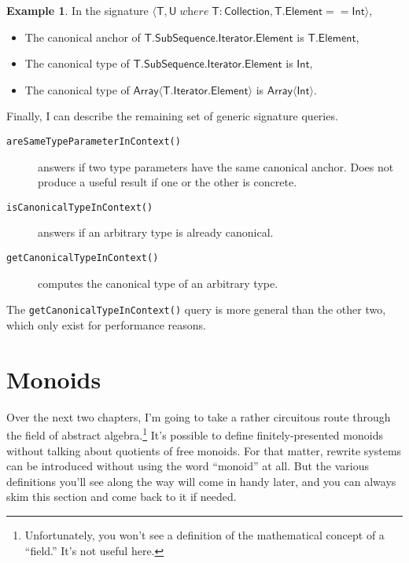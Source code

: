 \documentclass[headsepline,bibliography=totoc]{scrreport}
\newcommand{\namesym}[1]{\mathsf{#1}}
\newcommand{\genericparam}[1]{\bm{\mathsf{#1}}}
\newcommand{\proto}[1]{\bm{\mathsf{#1}}}
\newcommand{\gensig}[2]{\langle #1\;\textit{where}\;#2\rangle}
\theoremstyle{definition}
\newtheorem{example}{Example}[chapter]
\theoremstyle{definition}
\theoremstyle{definition}
\begin{document}
\begin{example}
In the signature
$\gensig{\genericparam{T},\genericparam{U}}
{\genericparam{T}\colon \proto{Collection},
\genericparam{T}.\namesym{Element}==\namesym{Int}}$,
\begin{itemize}
\item The canonical anchor of $\genericparam{T}.\namesym{SubSequence}.\namesym{Iterator}.\namesym{Element}$ is $\genericparam{T}.\namesym{Element}$,
\item The canonical type of $\genericparam{T}.\namesym{SubSequence}.\namesym{Iterator}.\namesym{Element}$ is $\namesym{Int}$,
\item The canonical type of $\namesym{Array}\langle \genericparam{T}.\namesym{Iterator}.\namesym{Element} \rangle$ is $\namesym{Array}\langle \namesym{Int}\rangle$.
\end{itemize}
\end{example}

Finally, I can describe the remaining set of generic signature queries.

\begin{description}
\item [\texttt{areSameTypeParameterInContext()}] answers if two type parameters have the same canonical anchor. Does not produce a useful result if one or the other is concrete.
\item [\texttt{isCanonicalTypeInContext()}] answers if an arbitrary type is already canonical.
\item [\texttt{getCanonicalTypeInContext()}] computes the canonical type of an arbitrary type.
\end{description}

The \texttt{getCanonicalTypeInContext()} query is more general than the other two, which only exist for performance reasons.

\chapter{Monoids}\label{monoids}

Over the next two chapters, I'm going to take a rather circuitous route through the field of abstract algebra.\footnote{Unfortunately, you won't see a definition of the mathematical concept of a ``field.'' It's not useful here.} It's possible to define finitely-presented monoids without talking about quotients of free monoids. For that matter, rewrite systems can be introduced without using the word ``monoid'' at all. But the various definitions you'll see along the way will come in handy later, and you can always skim this section and come back to it if needed.
\end{document}
